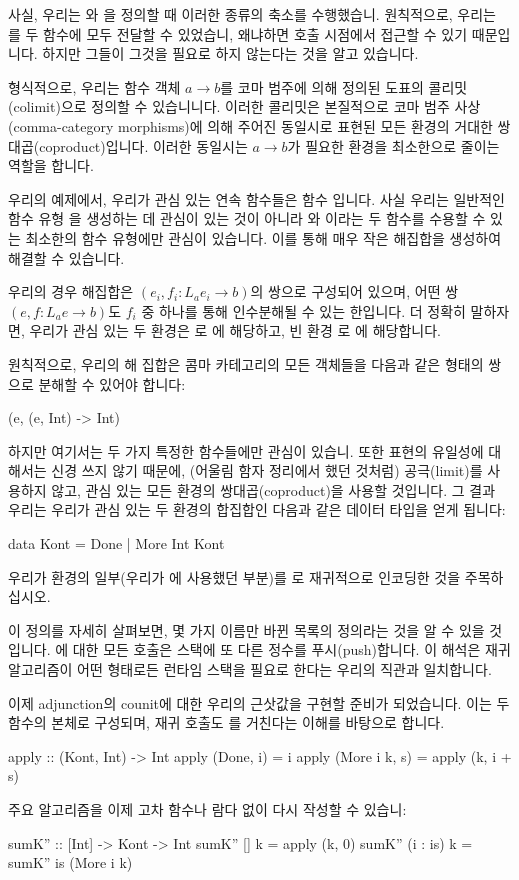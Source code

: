 \documentclass[DaoFP]{subfiles}
\begin{document}
사실, 우리는 와 을 정의할 때 이러한 종류의 축소를 수행했습니. 원칙적으로, 우리는 를 두 함수에 모두 전달할 수 있었습니, 왜냐하면 호출 시점에서 접근할 수 있기 때문입니다. 하지만 그들이 그것을 필요로 하지 않는다는 것을 알고 있습니다.

형식적으로, 우리는 함수 객체 $a \to b$를 코마 범주에 의해 정의된 도표의 콜리밋(colimit)으로 정의할 수 있습니니다. 이러한 콜리밋은 본질적으로 코마 범주 사상(comma-category morphisms)에 의해 주어진 동일시로 표현된 모든 환경의 거대한 쌍대곱(coproduct)입니다. 이러한 동일시는 $a \to b$가 필요한 환경을 최소한으로 줄이는 역할을 합니다.

우리의 예제에서, 우리가 관심 있는 연속 함수들은 함수 입니다. 사실 우리는 일반적인 함수 유형 을 생성하는 데 관심이 있는 것이 아니라 와 이라는 두 함수를 수용할 수 있는 최소한의 함수 유형에만 관심이 있습니다. 이를 통해 매우 작은 해집합을 생성하여 해결할 수 있습니다.

우리의 경우 해집합은 $(e_i, f_i \colon L_a e_i \to b)$의 쌍으로 구성되어 있으며, 어떤 쌍 $(e, f \colon L_a e \to b)$도 $f_i$ 중 하나를 통해 인수분해될 수 있는 한입니다. 더 정확히 말하자면, 우리가 관심 있는 두 환경은 로 에 해당하고, 빈 환경 \hask{()}로 에 해당합니다.

원칙적으로, 우리의 해 집합은 콤마 카테고리의 모든 객체들을 다음과 같은 형태의 쌍으로 분해할 수 있어야 합니다:
\begin{haskell}
(e, (e, Int) -> Int)
\end{haskell}
하지만 여기서는 두 가지 특정한 함수들에만 관심이 있습니. 또한 표현의 유일성에 대해서는 신경 쓰지 않기 때문에, (어울림 함자 정리에서 했던 것처럼) 공극(limit)를 사용하지 않고, 관심 있는 모든 환경의 쌍대곱(coproduct)을 사용할 것입니다. 그 결과 우리는 우리가 관심 있는 두 환경의 합집합인 다음과 같은 데이터 타입을 얻게 됩니다:
\begin{haskell}
data Kont = Done | More Int Kont
\end{haskell}
우리가  환경의 일부(우리가 에 사용했던 부분)를 로 재귀적으로 인코딩한 것을 주목하십시오.

이 정의를 자세히 살펴보면, 몇 가지 이름만 바뀐  목록의 정의라는 것을 알 수 있을 것입니다. 에 대한 모든 호출은  스택에 또 다른 정수를 푸시(push)합니다. 이 해석은 재귀 알고리즘이 어떤 형태로든 런타임 스택을 필요로 한다는 우리의 직관과 일치합니다.

이제 adjunction의 counit에 대한 우리의 근삿값을 구현할 준비가 되었습니다. 이는 두 함수의 본체로 구성되며, 재귀 호출도 를 거친다는 이해를 바탕으로 합니다.
\begin{haskell}
apply :: (Kont, Int) -> Int
apply (Done, i) = i
apply (More i k, s) = apply (k, i + s)
\end{haskell}
주요 알고리즘을 이제 고차 함수나 람다 없이 다시 작성할 수 있습니:
\begin{haskell}
sumK'' :: [Int] -> Kont -> Int
sumK'' [] k = apply (k, 0)
sumK'' (i : is) k = sumK'' is (More i k)
\end{haskell}
\end{document}
